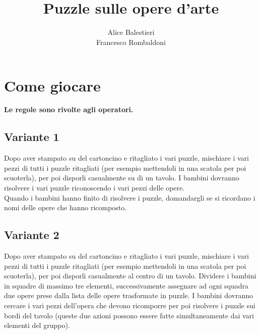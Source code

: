\documentclass[hidelinks,12pt,a4paper]{article}
\begin{document}
	
	\title{\textbf{\\Puzzle sulle opere d'arte}}
	\author{Alice Balestieri\\Francesco Rombaldoni}
	\date{}
	
	\maketitle
	\newpage
	
	\tableofcontents
	\newpage
	
	\section{Come giocare}
	\begin{center}
		\textbf{Le regole sono rivolte agli operatori.}
	\end{center}
	
	\subsection{Variante 1}
	Dopo aver stampato su del cartoncino e ritagliato i vari puzzle, mischiare i vari pezzi di tutti i puzzle ritagliati (per esempio mettendoli in una scatola per poi scuoterla), per poi disporli casualmente su di un tavolo. I bambini dovranno risolvere i vari puzzle riconoscendo i vari pezzi delle opere.\\
	Quando i bambini hanno finito di risolvere i puzzle, domandargli se si ricordano i nomi delle opere che hanno ricomposto.
	
	\subsection{Variante 2}
	Dopo aver stampato su del cartoncino e ritagliato i vari puzzle, mischiare i vari pezzi di tutti i puzzle ritagliati (per esempio mettendoli in una scatola per poi scuoterla), per poi disporli casualmente al centro di un tavolo. Dividere i bambini in squadre di massimo tre elementi, successivamente assegnare ad ogni squadra due opere prese dalla lista delle opere trasformate in puzzle. I bambini dovranno cercare i vari pezzi dell'opera che devono ricomporre per poi risolvere i puzzle sui bordi del tavolo (queste due azioni possono essere fatte simultaneamente dai vari elementi del gruppo).
	
\end{document}
